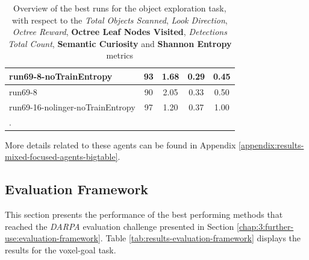 \begin{longtable}{|l|c|c|c|c|}
run69-8-noTrainEntropy & 93 & {\cellcolor[HTML]{73B8AA}} \color[HTML]{000000} 1.68 & {\cellcolor[HTML]{A7D1C9}} \color[HTML]{000000} 0.29 & {\cellcolor[HTML]{C0DDD7}} \color[HTML]{000000} 0.45 \\ \hline
run69-8 & 90 & {\cellcolor[HTML]{55AA99}} \color[HTML]{F1F1F1} 2.05 & {\cellcolor[HTML]{7ABCAF}} \color[HTML]{000000} 0.33 & {\cellcolor[HTML]{B6D8D1}} \color[HTML]{000000} 0.50 \\ \hline
run69-16-nolinger-noTrainEntropy & 97 & {\cellcolor[HTML]{9ACBC1}} \color[HTML]{000000} 1.20 & {\cellcolor[HTML]{55AA99}} \color[HTML]{F1F1F1} 0.37 & {\cellcolor[HTML]{55AA99}} \color[HTML]{F1F1F1} 1.00 \\ \hline


    \caption{Overview of the best runs for the object exploration task, with respect to the \textit{Total Objects Scanned}, \textit{Look Direction}, \textit{Octree Reward}, \textbf{Octree Leaf Nodes Visited}, \textit{Detections Total Count}, \textbf{Semantic Curiosity} and \textbf{Shannon Entropy} metrics}. \label{tab:results-mixed-agents}
\end{longtable}

More details related to these agents can be found in Appendix \ref{appendix:results-mixed-focused-agents-bigtable}.


\newpage
\subsection{Evaluation Framework}
This section presents the performance of the best performing methods that reached the \textit{DARPA} evaluation challenge presented in Section \ref{chap:3:further-use:evaluation-framework}. Table \ref{tab:results-evaluation-framework} displays the results for the voxel-goal task.


